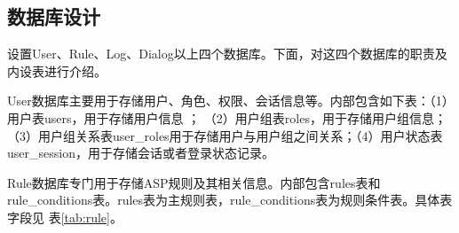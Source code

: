 \subsection{数据库设计}
设置User、Rule、Log、Dialog以上四个数据库。下面，对这四个数据库的职责及内设表进行介绍。

User数据库主要用于存储用户、角色、权限、会话信息等。内部包含如下表：（1）用户表users，用于存储用户信息 ；
（2）用户组表roles，用于存储用户组信息；（3）用户组关系表user\_roles用于存储用户与用户组之间关系；（4）用户状态表user\_session，用于存储会话或者登录状态记录。

Rule数据库专门用于存储ASP规则及其相关信息。内部包含rules表和rule\_conditions表。rules表为主规则表，rule\_conditions表为规则条件表。具体表字段见
表\ref{tab:rule}。
\begin{table}[h]
    \centering
    \renewcommand{\arraystretch}{1.3} %
    \caption{rule表字段设置及说明}
    \label{tab:rule}
\end{table}
